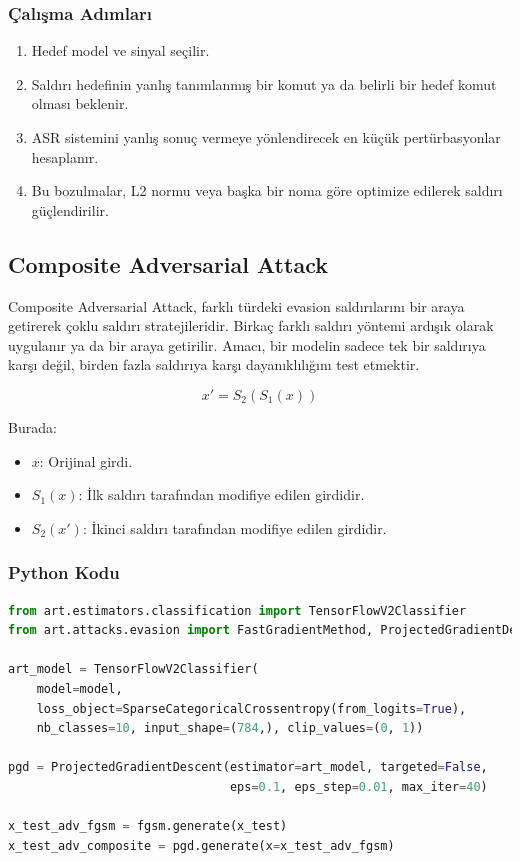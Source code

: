 \subsubsection{Çalışma Adımları}

\begin{enumerate}
    \item Hedef model ve sinyal seçilir.
    \item Saldırı hedefinin yanlış tanımlanmış bir komut ya da belirli bir hedef komut olması beklenir.
    \item ASR sistemini yanlış sonuç vermeye yönlendirecek en küçük pertürbasyonlar hesaplanır.
    \item Bu bozulmalar, L2 normu veya başka bir noma göre optimize edilerek saldırı güçlendirilir.
\end{enumerate}

\newpage

\subsection{Composite Adversarial Attack}

Composite Adversarial Attack, farklı türdeki evasion saldırılarını bir araya getirerek çoklu saldırı stratejileridir. Birkaç farklı saldırı yöntemi ardışık olarak uygulanır ya da bir araya getirilir. Amacı, bir modelin sadece tek bir saldırıya karşı değil, birden fazla saldırıya karşı dayanıklılığını test etmektir. 

\[ x' = S_2(S_1(x)) \]

Burada:

\begin{itemize}
    \item $x$: Orijinal girdi.
    \item $S_1(x)$: İlk saldırı tarafından modifiye edilen girdidir.
    \item $S_2(x')$: İkinci saldırı tarafından modifiye edilen girdidir.
\end{itemize}

\subsubsection{Python Kodu}

\begin{lstlisting}[language=Python]
from art.estimators.classification import TensorFlowV2Classifier
from art.attacks.evasion import FastGradientMethod, ProjectedGradientDescent

art_model = TensorFlowV2Classifier(
    model=model, 
    loss_object=SparseCategoricalCrossentropy(from_logits=True), 
    nb_classes=10, input_shape=(784,), clip_values=(0, 1))

pgd = ProjectedGradientDescent(estimator=art_model, targeted=False, 
                               eps=0.1, eps_step=0.01, max_iter=40)

x_test_adv_fgsm = fgsm.generate(x_test)
x_test_adv_composite = pgd.generate(x=x_test_adv_fgsm)
\end{lstlisting}

